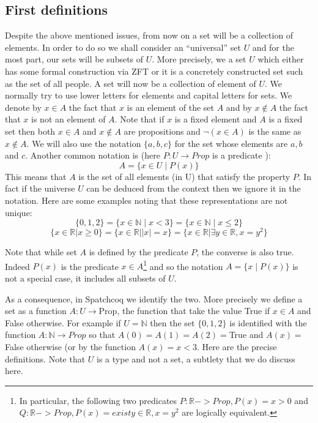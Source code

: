 \subsection{First definitions}
Despite the above mentioned issues, from now on a set will be a collection of elements. In order to do so we shall consider an ``universal'' set $U$ and for the most part, our sets will be subsets of $U$. More precisely, we a set $U$ which either has some formal construction via ZFT or it is a concretely constructed set such as the set of all people. A set will now be a collection of element of $U$.  We normally try to use lower letters for elements and capital letters for sets. We denote by $x\in A$ the fact that $x$ is an element of the set $A$ and by $x \not \in A$ the fact that $x$ is not an element of $A$. Note that if $x$ is a fixed element and $A$ is a fixed set then both $x\in A$ and $x \not\in A$ are propositions and $\neg (x \in A) $ is the same as $x \not \in A$. We will also use the notation $\{a, b, c\}$ for the set whose elements are $a,b$ and $c$. Another common notation is (here $P:U\rightarrow Prop$ is a predicate ):
$$A=\{x\in U \mid P(x)\}$$
This means that $A$ is the set of all elements (in U) that satisfy the property $P$. In fact if the universe $U$ can be deduced from the context then we ignore it in the notation. Here are some examples noting that these representations are not unique:
$$\{0, 1,2\}= \{  x \in \mathbb{N} \mid x< 3\}= \{  x \in \mathbb{N} \mid x\le2\}$$
$$ \{x \in \mathbb{R}| x\ge 0\}=  \{x \in \mathbb{R}| |x|=x\}= \{x \in \mathbb{R}| \exists y \in \mathbb{R}, x=y^{2}\}  $$


Note that while set $A$ is defined by the predicate $P$, the converse is also true. Indeed  $P(x)$ is the predicate $x \in A$\footnote{In particular, the following two predicates $P:\mathbb{R}->Prop, P(x)= x>0$ and $Q:\mathbb{R}->Prop, P(x)=exist y \in \mathbb{R}, x=y^{2}$ are logically equivalent.
} and so the notation $A=\{x \mid P(x)\}$ is not a special case, it includes all subsets of $U$. 




As a consequence,  in Spatchcoq we identify the two. More precisely we define a set as a function $A:U \rightarrow \mbox{Prop}$, the function that take the value True if $x \in A$ and False otherwise.  For example if $U=\mathbb{N}$ then the set $\{0,1,2\}$ is identified with the function $A:\mathbb{N}\rightarrow Prop$ so that $A(0)=A(1)=A(2)=$True and $A(x) =$ False otherwise (or by the function $A(x)=x<3$. Here are the precise definitions. Note that $U$ is a  type and not a set,  a subtlety that we do discuss here.

